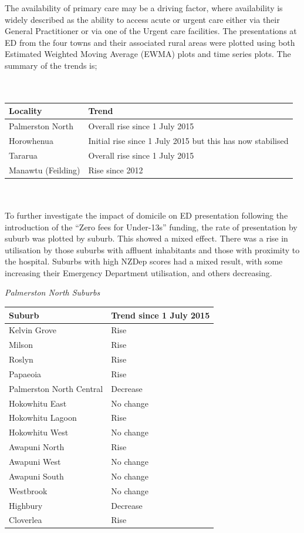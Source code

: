 \documentclass[11pt,a4paper]{article}
\begin{document}
The availability of primary care may be a driving factor, where availability is widely described as the ability to access acute or urgent care either via their General Practitioner or via one of the Urgent care facilities. The presentations at ED from the four towns and their associated rural areas were plotted using both Estimated Weighted Moving Average (EWMA) plots and time series plots. The summary of the trends is;\\ 
\\
\\
\begin{tabular}{|l|l|}
\hline 
        Locality & Trend\\
\hline
        Palmerston North & Overall rise since 1 July 2015\\
\hline
        Horowhenua & Initial rise since  1 July 2015 but this has now stabilised\\
\hline
        Tararua & Overall rise since 1 July 2015\\
\hline
        Manawtu (Feilding) & Rise since 2012\\
\hline
\end{tabular}
\\
\\
To further investigate the impact of domicile on ED presentation following the introduction of the “Zero fees for Under-13s” funding, the rate of presentation by suburb was plotted by suburb. This showed a mixed effect. There was a rise in utilisation by those suburbs with affluent inhabitants and those with proximity to the hospital. Suburbs with high NZDep scores had a mixed result, with some increasing their Emergency Department utilisation, and others decreasing.
\pagebreak


\emph{Palmerston North Suburbs}


\begin{tabular}{|l|l|}
\hline
        Suburb & Trend since 1 July 2015\\
\hline
        Kelvin Grove & Rise\\
\hline
        Milson & Rise\\
\hline
        Roslyn & Rise\\
\hline
        Papaeoia & Rise\\
\hline
        Palmerston North Central & Decrease\\
\hline
        Hokowhitu East & No change\\
\hline
        Hokowhitu Lagoon & Rise\\
\hline
        Hokowhitu West & No change\\
\hline
        Awapuni North & Rise\\
\hline
        Awapuni West & No change\\
\hline
        Awapuni South & No change\\
\hline
        Westbrook & No change\\
\hline
        Highbury & Decrease\\
\hline
        Cloverlea & Rise\\
\hline
\end{tabular}
\\
\\
\end{document}

